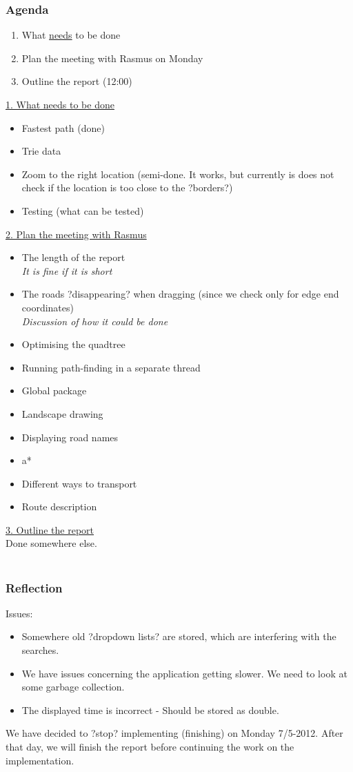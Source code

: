 \documentclass[a4paper,11pt]{article}
\begin{document}
\subsubsection*{Agenda}
\begin{enumerate}
	\item What \underline{needs} to be done
	\item Plan the meeting with Rasmus on Monday
	\item Outline the report (12:00)
\end{enumerate}
\underline{1. What needs to be done} \\
\begin{itemize}
	\item Fastest path (done)
	\item Trie data
	\item Zoom to the right location (semi-done. It works, but currently is does not check if the location is too close to the ?borders?)
	\item Testing (what can be tested)
\end{itemize}
\underline{2. Plan the meeting with Rasmus} \\
\begin{itemize}
	\item The length of the report \\
		\textsl{It is fine if it is short}
	\item The roads ?disappearing? when dragging (since we check only for edge end coordinates) \\
		\textsl{Discussion of how it could be done}
	\item Optimising the quadtree
	\item Running path-finding in a separate thread
	\item Global package
	\item Landscape drawing
	\item Displaying road names
	\item a*
	\item Different ways to transport
	\item Route description
\end{itemize}
\underline{3. Outline the report} \\
Done somewhere else. \\ \\

\subsubsection*{Reflection}
Issues:
\begin{itemize}
	\item Somewhere old ?dropdown lists? are stored, which are interfering with the searches.
	\item We have issues concerning the application getting slower. We need to look at some garbage collection.
	\item The displayed time is incorrect - Should be stored as double.
\end{itemize}
We have decided to ?stop? implementing (finishing) on Monday 7/5-2012.
After that day, we will finish the report before continuing the work on the implementation.
\end{document}
